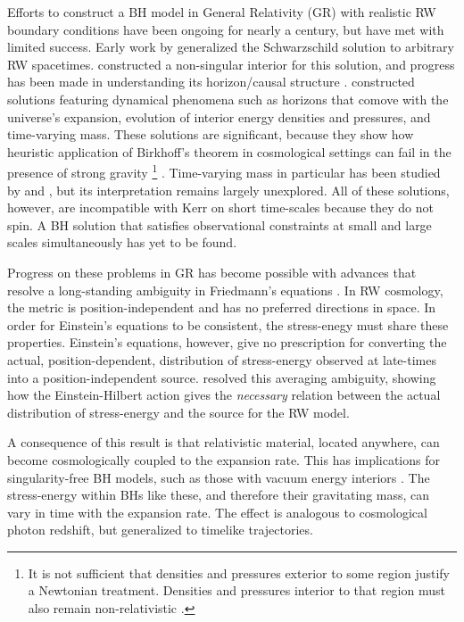 \documentclass[twocolumn,twocolappendix]{aastex631}
\begin{document}
Efforts to construct a BH model in General Relativity (GR) with realistic RW boundary conditions have been ongoing for nearly a century, but have met with limited success.
Early work by \citet{mcvittie1933mass} generalized the Schwarzschild solution to arbitrary RW spacetimes.
\citet{nolan1993sources} constructed a non-singular interior for this solution, and progress has been made in understanding its horizon/causal structure \citep[e.g.][]{kaloper2010mcvittie, lake2011more, faraoni2012bizarre, da2013expansion}.
\citet{farja07} constructed solutions featuring dynamical phenomena such as horizons that comove with the universe's expansion, evolution of interior energy densities and pressures, and time-varying mass.
These solutions are significant, because they show how heuristic application of Birkhoff's theorem in cosmological settings can fail in the presence of strong gravity%
\footnote{
  It is not sufficient that densities and pressures exterior to some region justify a Newtonian treatment.
  Densities and pressures interior to that region must also remain non-relativistic \citep{weinberg2008cosmology}.
}
\citep[c.f.][]{lemaitre1931, einstein1945influence, callandickepeebles1965wrong, peebles1993principles}.
Time-varying mass in particular has been studied by \citet{guariento2012realistic} and \citet{maciel2015timedep}, but its interpretation remains largely unexplored.
All of these solutions, however, are incompatible with Kerr on short time-scales because they do not spin.
A BH solution that satisfies observational constraints at small and large scales simultaneously has yet to be found.

Progress on these problems in GR has become possible with advances that resolve a long-standing ambiguity in Friedmann's equations \citep[e.g.][]{ellis1987fitting}.
In RW cosmology, the metric is position-independent and has no preferred directions in space.
In order for Einstein's equations to be consistent, the stress-enegy must share these properties.
Einstein's equations, however, give no prescription for converting the actual, position-dependent, distribution of stress-energy observed at late-times into a position-independent source.
\citet{cro19} resolved this averaging ambiguity, showing how the Einstein-Hilbert action gives the \emph{necessary} relation between the actual distribution of stress-energy and the source for the RW model. 

A consequence of this result is that relativistic material, located anywhere, can become cosmologically coupled to the expansion rate.
This has implications for singularity-free BH models, such as those with vacuum energy interiors \citep[e.g.][]{gliner1966algebraic, dymnikova1992vacuum, chaplinelaughlin2002, mazur2004gravitational, lobo2006stable, mazur2015surface, dymnikova2016regular, posada2017slowly, posada2019radial, beltracchi2019formation}.
The stress-energy within BHs like these, and therefore their gravitating mass, can vary in time with the expansion rate.
The effect is analogous to cosmological photon redshift, but generalized to timelike trajectories. 
\end{document}
